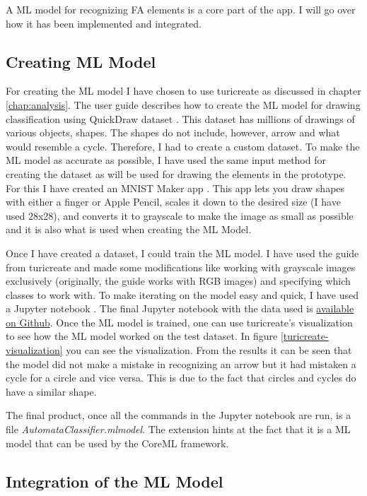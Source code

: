 A ML model for recognizing FA elements is a core part of the app. I will go over how it has been implemented and integrated.

\subsection{Creating ML Model}

For creating the ML model I have chosen to use turicreate \cite{turicreate} as discussed in chapter \ref{chap:analysis}. The user guide \cite{drawing-classification} describes how to create the ML model for drawing classification using QuickDraw dataset \cite{quickdraw}. This dataset has millions of drawings of various objects, shapes. The shapes do not include, however, arrow and what would resemble a cycle. Therefore, I had to create a custom dataset. To make the ML model as accurate as possible, I have used the same input method for creating the dataset as will be used for drawing the elements in the prototype. For this I have created an MNIST Maker app \cite{mnist-maker}. This app lets you draw shapes with either a finger or Apple Pencil, scales it down to the desired size (I have used 28x28), and converts it to grayscale to make the image as small as possible and it is also what is used when creating the ML Model.

Once I have created a dataset, I could train the ML model. I have used the guide from turicreate and made some modifications like working with grayscale images exclusively (originally, the guide works with RGB images) and specifying which classes to work with. To make iterating on the model easy and quick, I have used a Jupyter notebook \cite{jupyter}. The final Jupyter notebook with the data used is \href{https://github.com/fortmarek/automata-editor-model/}{available on Github}. Once the ML model is trained, one can use turicreate's visualization to see how the ML model worked on the test dataset. In figure \ref{turicreate-visualization} you can see the visualization. From the results it can be seen that the model did not make a mistake in recognizing an arrow but it had mistaken a cycle for a circle and vice versa. This is due to the fact that circles and cycles do have a similar shape.

The final product, once all the commands in the Jupyter notebook are run, is a file \textit{AutomataClassifier.mlmodel}. The extension hints at the fact that it is a ML model that can be used by the CoreML framework.

\subsection{Integration of the ML Model}

